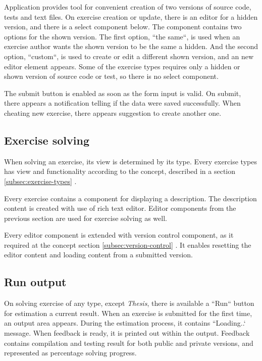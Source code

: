         Application provides tool for convenient creation of two versions of source code, tests and text files. On exercise creation or update, there is an editor for a hidden version, and there is a select component below. The component contains two options for the shown version. The first option, ``the same``, is used when an exercise author wants the shown version to be the same a hidden. And the second option, ``custom``, is used to create or edit a different shown version, and an new editor element appears. Some of the exercise types requires only a hidden or shown version of source code or test, so there is no select component.
        
        The submit button is enabled as soon as the form input is valid. On submit, there appears a notification telling if the data were saved successfully. When cheating new exercise, there appears suggestion to create another one.
        
        \subsection{Exercise solving}
        When solving an exercise, its view is determined by its type. Every exercise types has view and functionality according to the concept, described in a section \ref{subsec:exercise-types} .
        
        Every exercise contains a component for displaying a description. The description content is created with use of rich text editor. Editor components from the previous section are used for exercise solving as well.
        
        Every editor component is extended with version control component, as it required at the concept section \ref{subsec:version-control} . It enables resetting the editor content and loading content from a submitted version.
        
        \subsection{Run output}
        On solving exercise of any type, except \textit{Thesis}, there is available a ``Run`` button for estimation a current result. When an exercise is submitted for the first time, an output area appears. During the estimation process, it contains ``Loading..` message. When feedback is ready, it is printed out within the output. Feedback contains compilation and testing result for both public and private versions, and represented as percentage solving progress.
        
